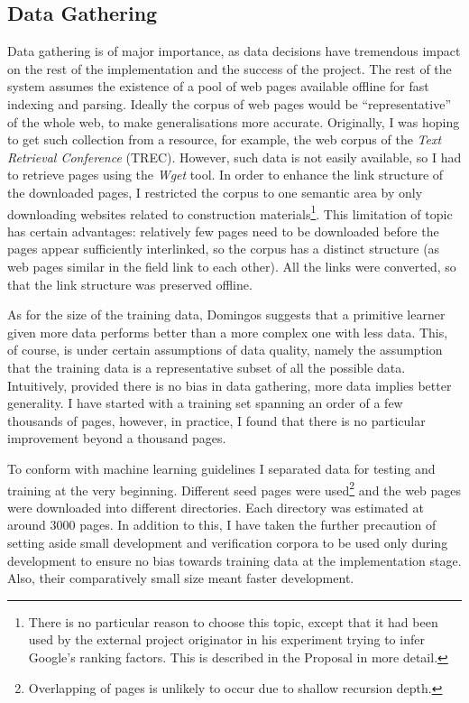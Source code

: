 \documentclass[12pt,notitlepage,twoside]{scrbook}
\begin{document}
\subsection{Data Gathering}
\label{prep:data}
Data gathering is of major importance, as data decisions have tremendous impact on the
rest of the implementation and the success of the project. The rest of the system assumes
the existence of a pool of web pages available offline for fast indexing and parsing.
Ideally the corpus of web pages would be ``representative'' of the whole web, to make
generalisations more accurate.  Originally, I was hoping to get such collection from a
resource, for example, the web corpus of the \textit{Text Retrieval Conference} (TREC).
However, such data is not easily available, so I had to retrieve pages using the
\textit{Wget} tool. In order to enhance the link structure of the downloaded pages, I restricted the corpus to one
semantic area by only downloading websites related to construction
materials\footnote{There is no particular reason to choose this topic, except that it had
been used by the external project originator in his experiment trying to infer Google's
ranking factors. This is described in the Proposal in more detail.}. This limitation of
topic has certain advantages: relatively few pages need to be  downloaded before the pages
appear sufficiently interlinked, so the corpus has a distinct structure (as web pages
similar in the field link to each other). All the links were converted, so that the link
structure was preserved offline.

As for the size of the training data, Domingos\cite{domingos} suggests that a primitive
learner given more data performs better than a more complex one with less data.  This, of
course, is under certain assumptions of data quality, namely the assumption that the
training data is a representative subset of all the possible data. Intuitively, provided
there is no bias in data gathering, more data implies better generality. I have started
with a training set spanning an order of a few thousands of pages, however, in practice, I
found that there is no particular improvement beyond a thousand pages.

To conform with machine learning guidelines I separated data for testing and training at the
very beginning. Different seed pages were used\footnote{Overlapping of pages is unlikely
to occur due to shallow recursion depth.} and the web pages were downloaded into
different directories.  Each directory was estimated at around 3000 pages. In addition to
this, I have taken the further precaution of setting aside small development and
verification corpora to be used only during development to ensure no bias towards training
data at the implementation stage. Also, their comparatively small size meant faster
development.
\end{document}
